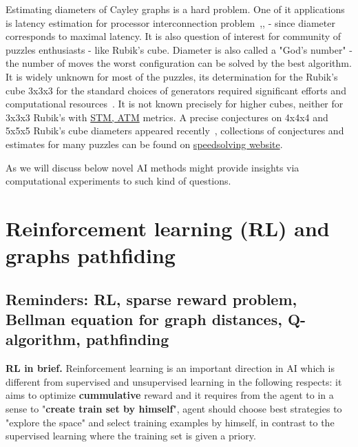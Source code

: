 \documentclass[atmp]{ipart_v1}
\numberwithin{equation}{section}
\theoremstyle{plain}%
\begin{document}
Estimating diameters of Cayley graphs is a hard problem. One of it applications is latency estimation for processor interconnection problem~\cite{akers1989group},\cite{cooperman1991applications}, \cite{heydemann1997cayley} - since diameter corresponds to maximal latency. 
It is also question of interest for community of puzzles enthusiasts - like Rubik's cube. Diameter is also called a "God's number" - the number of moves the worst configuration can be solved by the best algorithm. It is widely unknown for most of the puzzles, its determination for the Rubik's cube 3x3x3 for the standard choices of generators required significant efforts and computational resources~\cite{Rokicki2014Diameter}.  It is not known precisely for higher cubes, neither for 3x3x3 Rubik's with \href{https://www.speedsolving.com/wiki/index.php?title=Metric#STM}{STM, ATM} metrics.%
A precise conjectures on 4x4x4 and 5x5x5 Rubik's cube diameters appeared recently~\cite{hirata2024probabilistic}, collections of conjectures and estimates for many puzzles can be found on \href{https://www.speedsolving.com/wiki/index.php?title=God%27s_Algorithm#Table_of_God.27s_Numbers}{speedsolving website}. 

As we will discuss below novel AI methods might provide insights via computational experiments to such kind of questions.


\section{Reinforcement learning (RL) and graphs pathfiding}
\subsection{Reminders: RL, sparse reward problem, Bellman equation for graph distances,  Q-algorithm, pathfinding}

{\bf RL in brief.}
Reinforcement learning is an important direction 
in AI which is different from supervised and unsupervised learning in the following respects: it aims to optimize {\bf cummulative} reward and it requires from the agent to in a sense to "{\bf create train set by himself}", agent should choose best strategies to "explore the space" and select training examples by himself, in contrast to the supervised learning where the training set is given a priory. 
\end{document}
